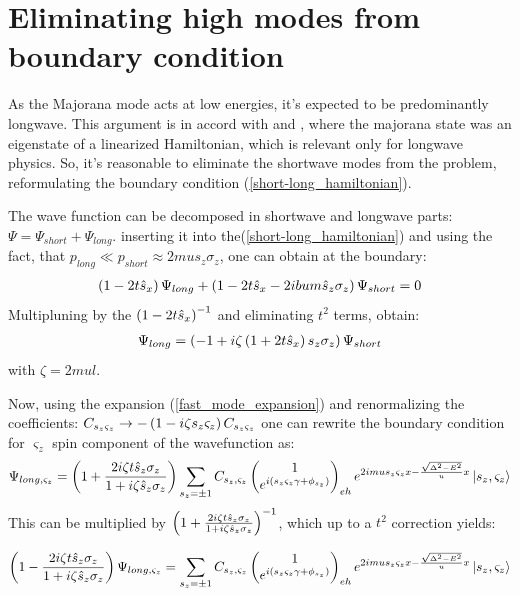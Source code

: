 \section{Eliminating high modes from boundary condition}
As the Majorana mode acts at low energies, it's expected to be predominantly longwave. This argument is in accord with \cite{Oreg_2010} and \cite{Lutchyn_2010}, where the majorana state was an eigenstate of a linearized Hamiltonian, which is relevant only for longwave physics. So, it's reasonable to eliminate the shortwave modes from the problem, reformulating the boundary condition (\ref{short-long_hamiltonian}).

The wave function can be decomposed in shortwave and  longwave  parts: $ \Psi = \Psi_{short}+\Psi_{long} $. inserting it into the(\ref{short-long_hamiltonian}) and using the fact, that $ p_{long}\ll p_{short} \approx 2mu s_z \sigma_z $, one can obtain at the boundary:
\begin{gather}
	\left(1-2t\hat{s}_x\right)\Psi_{long}+\left(1-2t\hat{s}_x-2ibum\hat{s}_z \sigma_z\right)\Psi_{short}=0
\end{gather}
Multipluning by the $ \left(1-2t\hat{s}_x\right)^{-1} $ and eliminating $ {t^2} $ terms, obtain:
\begin{gather}
	\Psi_{long}
	=
	\left(-1+i\zeta\left(1+2t\hat{s}_x\right)s_z \sigma_z\right)\Psi_{short}
\end{gather}
with $ \zeta=2mul $.

Now, using the expansion (\ref{fast_mode_expansion}) and renormalizing the coefficients: $ C_{s_z \varsigma_z}\to-\left(1-i\zeta s_z \varsigma_z\right)C_{s_z \varsigma_z} $ one can rewrite the boundary condition for $ \varsigma_z $ spin component of the wavefunction as:
\begin{gather}
\Psi_{long,\varsigma_z}
=
\left(1+\frac{2i\zeta t\hat{s}_z\sigma_z}{1+i\zeta \hat{s}_z\sigma_z}\right)
\sum_{s_z=\pm1}
C_{s_z,\varsigma_z}
		\begin{pmatrix}
	1
	\\
	e^{i\left(s_z\varsigma_z\gamma+\phi_{s_z}\right)}
	\end{pmatrix}_{eh}
	e^{2imus_z\varsigma_zx -\frac{\sqrt{\Delta^2-E^2}}{u}x}
	\ket{s_z, \varsigma_z}
\end{gather}
This can be  multiplied by $ \left(1+\frac{2i\zeta t\hat{s}_z\sigma_z}{1+i\zeta \hat{s}_z\sigma_z}\right)^{-1} $, which up to a $ t^2 $ correction yields:

\begin{gather}
\label{bc_projection}
	\left(1-\frac{2i\zeta t\hat{s}_z\sigma_z}{1+i\zeta \hat{s}_z\sigma_z}\right)
	\Psi_{long,\varsigma_z}
	=
	\sum_{s_z=\pm1}
	C_{s_z,\varsigma_z}
			\begin{pmatrix}
	1
	\\
	e^{i\left(s_z\varsigma_z\gamma+\phi_{s_z}\right)}
	\end{pmatrix}_{eh}
	e^{2imus_z\varsigma_zx -\frac{\sqrt{\Delta^2-E^2}}{u}x}
	\ket{s_z, \varsigma_z}
\end{gather}

